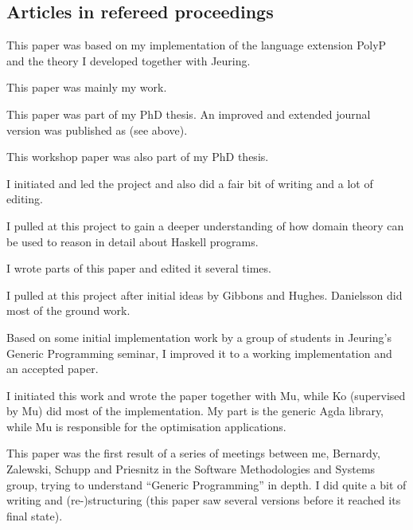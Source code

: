 \subsection{Articles in refereed proceedings}
\begin{itemize}
%
This paper was based on my implementation of the language extension
PolyP and the theory I developed together with Jeuring.

This paper was mainly my work.

This paper was part of my PhD thesis.
%
An improved and extended journal version was published as
\cite{janssonjeuring-dataconv} (see above).

%
This workshop paper was also part of my PhD thesis.

%
I initiated and led the project and also did a fair bit of writing and
a lot of editing.

%
I pulled at this project to gain a deeper understanding of how domain
theory can be used to reason in detail about Haskell programs.

%
I wrote parts of this paper and edited it several times.

%
I pulled at this project after initial ideas by Gibbons and Hughes.
%
Danielsson did most of the ground work.

%
Based on some initial implementation work by a group of students in
Jeuring's Generic Programming seminar, I improved it to a working
implementation and an accepted paper.

%
I initiated this work and wrote the paper together with Mu, while Ko
(supervised by Mu) did most of the implementation.
%
My part is the generic Agda library, while Mu is responsible for the
optimisation applications.

%
This paper was the first result of a series of meetings between me,
Bernardy, Zalewski, Schupp and Priesnitz in the Software Methodologies
and Systems group, trying to understand ``Generic Programming'' in
depth.
%
I did quite a bit of writing and (re-)structuring (this paper saw
several versions before it reached its final state).


\end{itemize}
